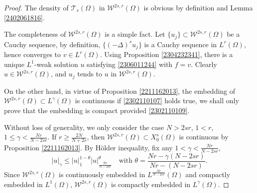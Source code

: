 \documentclass[10pt]{article}
\numberwithin{equation}{section}
\numberwithin{equation}{section}
\begin{document}
\begin{proof}
The density of $\mathcal{T}_s(\Omega)$ in $\mathcal{W}^{2s, r}(\Omega)$ is obvious by definition and Lemma \ref{2402061816}. 

The completeness of $\mathcal{W}^{2s, r}(\Omega)$ is a simple fact. Let $\{u_j\}\subset \mathcal{W}^{2s, r}(\Omega)$ be a Cauchy sequence, by definition, $\{(-\Delta)^s u_j\}$ is a Cauchy sequence in $L^r({\Omega})$, hence converges to $v\in L^r({\Omega})$. Using Proposition \ref{2304232341}, there is a unique $L^1$-weak solution $u$ satisfying \eqref{2306011244} with $f = v$. Clearly $u \in \mathcal{W}^{2s, r}(\Omega)$, and $u_j$ tends to $u$ in $\mathcal{W}^{2s, r}(\Omega)$.

On the other hand, in virtue of Proposition \ref{2211162013}, the embedding of $\mathcal{W}^{2s, r}(\Omega)\subset L^\gamma(\Omega)$ is continuous if \eqref{2302110107} holds true, we shall only prove that the embedding is compact provided \eqref{2302110109}.

Without loss of generality, we only consider the case $N>2sr$, $1 < r$, $1 \le\gamma<\frac{Nr}{N-2sr}$. If $r\ge \frac{2N}{N+2s}$, then $\mathcal{W}^{2s, r}(\Omega)\subset X_0^s(\Omega)$ is continuous by Proposition \ref{2211162013}. By H\"older inequality, fix any $1 < \gamma<\frac{Nr}{N-2sr}$,
\begin{equation}\label{2302111630}
|u|_{{\gamma}}\le |u|^{1-\theta}_{{1}}|u|^{\theta}_{{\frac{Nr}{N-2sr}}} \quad \mbox{with } \theta=\frac{Nr-\gamma (N-2sr)}{Nr-(N-2sr)}.
\end{equation}
Since $\mathcal{W}^{2s, r}(\Omega)$ is continuously embedded in $L^{\frac{Nr}{N-2sr}}(\Omega)$ and compactly embedded  in $L^1(\Omega)$, $\mathcal{W}^{2s, r}(\Omega)$ is compactly embedded in $L^{\gamma}(\Omega)$.


\end{proof}
\end{document}
